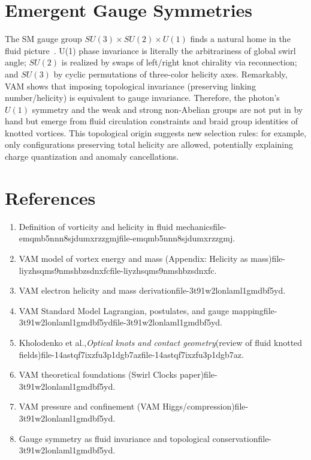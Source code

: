 \documentclass[a4paper,12pt]{article}
\begin{document}
\section*{Emergent Gauge Symmetries}
The SM gauge group $SU(3)\times SU(2)\times U(1)$ finds a natural home in the fluid picture~\cite{4-StandardModel-Lagrangian-VAM}. U(1) phase invariance is literally the arbitrariness of global swirl angle; $SU(2)$ is realized by swaps of left/right knot chirality via reconnection; and $SU(3)$ by cyclic permutations of three-color helicity axes. Remarkably, VAM shows that imposing topological invariance (preserving linking number/helicity) is equivalent to gauge invariance. Therefore, the photon’s $U(1)$ symmetry and the weak and strong non-Abelian groups are not put in by hand but emerge from fluid circulation constraints and braid group identities of knotted vortices. This topological origin suggests new selection rules: for example, only configurations preserving total helicity are allowed, potentially explaining charge quantization and anomaly cancellations.



\section*{References}
\begin{enumerate}
\item Definition of vorticity and helicity in fluid mechanicsfile-emqmb5nnn8sjdumxrzzgmjfile-emqmb5nnn8sjdumxrzzgmj.

\item VAM model of vortex energy and mass (Appendix: Helicity as mass)file-liyzhsqms9nmshbzsdnxfcfile-liyzhsqms9nmshbzsdnxfc.

\item VAM electron helicity and mass derivationfile-3t91w2lonlaml1gmdbf5yd.

\item VAM Standard Model Lagrangian, postulates, and gauge mappingfile-3t91w2lonlaml1gmdbf5ydfile-3t91w2lonlaml1gmdbf5yd.

\item Kholodenko et al.,\textit{Optical knots and contact geometry}(review of fluid knotted fields)file-14astqf7ixzfu3p1dgb7azfile-14astqf7ixzfu3p1dgb7az.

\item VAM theoretical foundations (Swirl Clocks paper)file-3t91w2lonlaml1gmdbf5yd.

\item VAM pressure and confinement (VAM Higgs/compression)file-3t91w2lonlaml1gmdbf5yd.

\item Gauge symmetry as fluid invariance and topological conservationfile-3t91w2lonlaml1gmdbf5yd.


\end{enumerate}
\end{document}
